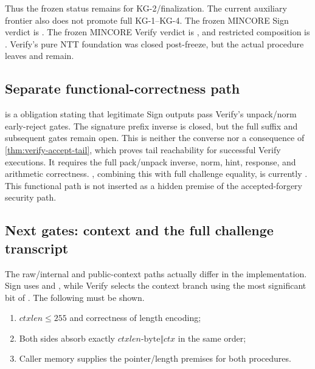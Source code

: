 Thus the frozen  status remains \statuspartial{} for
KG-2/finalization. The current auxiliary frontier also does not promote full
KG-1--KG-4. The frozen MINCORE Sign verdict is
. The frozen MINCORE Verify verdict is
, and restricted composition is
\statusspecified. Verify's pure NTT foundation was closed post-freeze, but the
actual procedure leaves
\allowbreak
{} and
 remain.

\subsection{Separate functional-correctness path}

 is a \statuspartial{} obligation stating that
legitimate Sign outputs pass Verify's unpack/norm early-reject gates. The signature
prefix inverse is closed, but the full suffix and subsequent gates remain open.
This is neither the converse nor a consequence of \cref{thm:verify-accept-tail},
which proves tail reachability for successful Verify executions. It requires the
full pack/unpack inverse, norm, hint, response, and arithmetic correctness.
, combining this with full challenge equality,
is currently \statusblocked. This functional path is not inserted as a hidden
premise of the accepted-forgery security path.

\subsection{Next gates: context and the full challenge transcript}

The raw/internal and public-context paths actually differ in the implementation.
Sign uses  and , while
Verify selects the context branch using the most significant bit of
. The following must be shown.

\begin{enumerate}
  \item \(ctxlen\le255\) and correctness of length encoding;
  \item Both sides absorb exactly \(ctxlen\text{-byte}\Vert ctx\) in the same order;
  \item Caller memory supplies the pointer/length premises for both procedures.
\end{enumerate}

